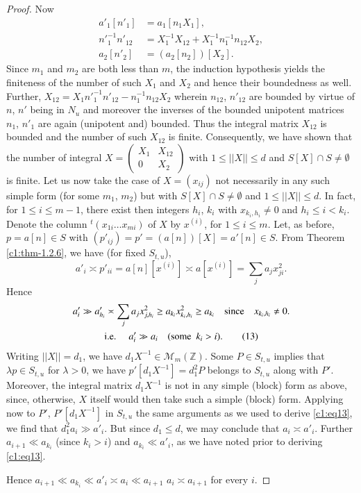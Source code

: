 \begin{proof}
Now
\begin{align*}
a'_{1}[n'_{1}]&=a_{1}[n_{1}X_{1}],\\
{n'}^{-1}_{1}n'_{12}&=X^{-1}_{1}X_{12}+X^{-1}_{1}n^{-1}_{1}n_{12}X_{2},\\
a_{2}[n'_{2}]&=(a_{2}[n_{2}])[X_{2}].
\end{align*}
Since $m_{1}$ and $m_{2}$ are both less than $m$, the induction
hypothesis yields the finiteness of the number of such $X_{1}$ and
$X_{2}$ and hence their boundedness as well. Further,
$X_{12}=X_{1}{n'}^{-1}_{1}n'_{12}-n^{-1}_{1}n_{12}X_{2}$ wherein
$n_{12}$, $n'_{12}$ are bounded by virtue of $n$, $n'$ being in
$N_{u}$ and moreover the inverses of the bounded unipotent matrices
$n_{1}$, $n'_{1}$ are again (unipotent and) bounded. Thus the integral
matrix $X_{12}$ is bounded and the number of such $X_{12}$ is
finite. Consequently, we have shown that the number of integral
$X=\left(\begin{smallmatrix} X_{1} & X_{12}\\ 0 & X_{2}
\end{smallmatrix}\right)$ with $1\leq ||X||\leq d$ and $S[X]\cap S\neq
\emptyset$ is finite. Let us now take the case of $X=(x_{ij})$ not
necessarily in any such simple form (for some $m_{1}$, $m_{2}$) but
with $S[X]\cap S\neq \emptyset$ and $1\leq ||X||\leq d$. In fact, for
$1\leq i\leq m-1$, there exist then integers $h_{i}$, $k_{i}$ with
$x_{k_{i},h_{i}}\neq 0$ and $h_{i}\leq i<k_{i}$. Denote the column
${}^{t}(x_{1i}\ldots x_{mi})$ of $X$ by $x^{(i)}$, for $1\leq i\leq
m$. Let, as before, $p=a[n]\in S$ with
$(p'_{ij})=p'=(a[n])[X]=a'[n]\in S$. From Theorem \ref{c1:thm-1.2.6}, we
have (for fixed $S_{t,u}$),
$$
a'_{i}\asymp p'_{ii}=a[n][x^{(i)}]\asymp
a[x^{(i)}]=\sum_{j}a_{j}x^{2}_{ji}.
$$
Hence\pageoriginale
\begin{gather*}
a'_{i}\gg a'_{h_{i}}\asymp \sum_{j}a_{j}x^{2}_{j,h_{i}}\geq
a_{k_{i}}x^{2}_{k_{i},h_{i}}\geq a_{k_{i}}\quad\text{since}\quad
x_{k_{i},h_{i}}\neq 0.\\
\text{{i.e.}\kern.3em}\quad a'_{i}\gg a_{i}\quad \text{(some \ }
k_{i}>i).\tag{13}\label{c1:eq13} 
\end{gather*}
Writing $||X||=d_{1}$, we have
$d_{1}X^{-1}\in\mathscr{M}_{m}(\mathbb{Z})$. Some $P\in S_{t,u}$
implies that $\lambda p\in S_{t,u}$ for $\lambda>0$, we have
$p'[d_{1}X^{-1}]=d^{2}_{1}P$ belongs to $S_{t,u}$ along with
$P'$. Moreover, the integral matrix $d_{1}X^{-1}$ is not in any simple
(block) form as above, since, otherwise, $X$ itself would then take
such a simple (block) form. Applying now to $P'$, $P'[d_{1}X^{-1}]$ in
$S_{t,u}$ the same arguments as we used to derive \eqref{c1:eq13}, we
find that $d^{2}_{1}a_{i}\gg a'_{i}$. But since $d_{1}\leq d$, we may
conclude that $a_{i}\asymp a'_{i}$. Further $a_{i+1}\ll a_{k_{i}}$
(since $k_{i}>i$) and $a_{k_{i}}\ll a'_{i}$, as we have noted prior to
deriving \eqref{c1:eq13}. 

Hence $a_{i+1}\ll a_{k_{i}}\ll a'_{i}\asymp a_{i}\ll a_{i+1}$ \ie
$a_{i}\asymp a_{i+1}$ for every $i$.
\end{proof}

